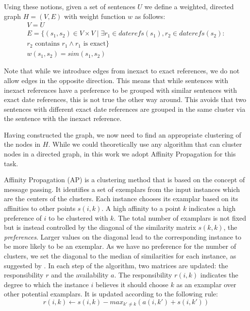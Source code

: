 \documentclass[a4paper,BCOR=10mm]{report}
\numberwithin{lemma}{chapter}
\numberwithin{definition}{chapter}
\begin{document}
Using these notions, given a set of sentences $U$ we define a weighted, directed graph $H = (V, E)$ with weight function $w$ as follows:
\begin{align}
V = U \\
E = \{ (s_1, s_2) \in V \times V \mid \exists r_1 \in \mathit{daterefs}(s_1), r_2 \in \mathit{daterefs}(s_2) \colon \\ r_2 \text{ contains } r_1 \land r_1 \text{ is exact} \} \\ %
w(s_1, s_2) = \mathit{sim}(s_1, s_2)
\end{align}

Note that while we introduce edges from inexact to exact references, we do not allow edges in the opposite direction. This means that while sentences with inexact references have a preference to be grouped with similar sentences with exact date references, this is not true the other way around.
This avoids that two sentences with different exact date references are grouped in the same cluster via the sentence with the inexact reference.

Having constructed the graph, we now need to find an appropriate clustering of the nodes in $H$. While we could theoretically use any algorithm that can cluster nodes in a directed graph, in this work we adopt Affinity Propagation for this task.

Affinity Propagation (AP) \citep{ap} is a clustering method that is based on the concept of message passing. It identifies a set of exemplars from the input instances which are the centers of the clusters. Each instance chooses its examplar based on its affinities to other points $s(i, k)$. A high affinity to a point $k$ indicates a high preference of $i$ to be clustered with $k$.
The total number of examplars is not fixed but is instead controlled by the diagonal of the similarity matrix $s(k, k)$, the \textit{preferences}. Larger values on the diagonal lead to the corresponding instance to be more likely to be an exemplar.
As we have no preference for the number of clusters, we set the diagonal to the median of similarities for each instance, as suggested by \citeauthor{ap}.
In each step of the algorithm, two matrices are updated: the responsibility $r$ and the availability $a$. The responsibility $r(i, k)$ indicates the degree to which the instance $i$ believes it should choose $k$ as an examplar over other potential examplars. It is updated according to the following rule:
\begin{equation}
r(i, k) \leftarrow s(i, k) - max_{k' \neq k}( a(i, k') + s(i, k') )
\end{equation}
\end{document}
